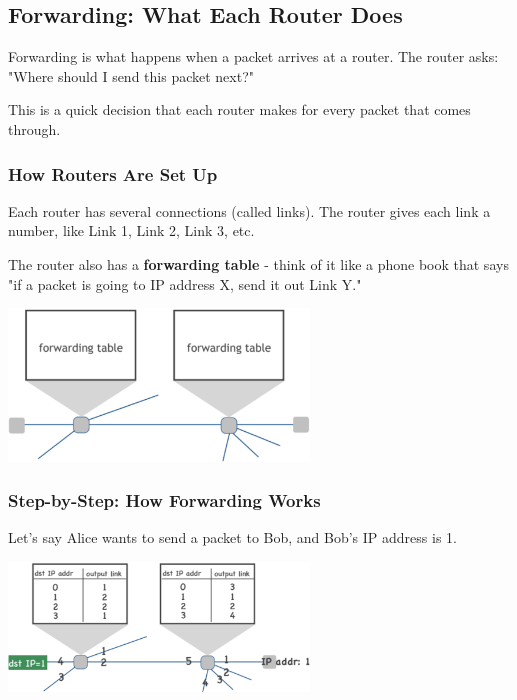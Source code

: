 \documentclass[../../compsys.tex]{subfiles}
\begin{document}
\subsection{Forwarding: What Each Router Does}
Forwarding is what happens when a packet arrives at a router. The router asks: "Where should I send this packet next?"

This is a quick decision that each router makes for every packet that comes through.

\subsubsection{How Routers Are Set Up}
Each router has several connections (called links). The router gives each link a number, like Link 1, Link 2, Link 3, etc.

The router also has a \textbf{forwarding table} - think of it like a phone book that says "if a packet is going to IP address X, send it out Link Y."

\begin{center}
    \includegraphics[width=0.6\textwidth]{images/forwarding-table.png}
\end{center}

\subsubsection{Step-by-Step: How Forwarding Works}
Let's say Alice wants to send a packet to Bob, and Bob's IP address is 1.

\begin{center}
    \includegraphics[width=0.6\textwidth]{images/forwarding.png}
\end{center}
\end{document}
